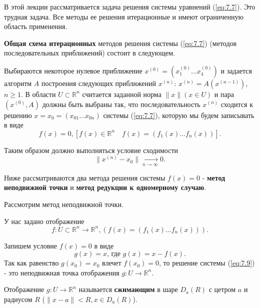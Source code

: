В этой лекции рассматривается задача решения системы уравнений (\ref{eq:7.7}). Это трудная задача. Все методы ее решения итерационные и имеют ограниченную область применения. 

\textbf{Общая схема итерационных} методов решения системы (\ref{eq:7.7}) (методов последовательных приближений) состоит в следующем.

Выбираются некоторое нулевое приближение $x^{(0)} = (x_1^{(0)} \dots x_4^{(0)})$ и задается алгоритм $A$ построения следующих приближений $x^{(n)}$: $x^{(n)} = A(x^{(n-1)})$, $n \geq 1$. В области $U \subset \mathbb{R}^n$ считается заданной норма $\|x\| (x \in U)$ и пара $(x^{(0)}, A)$ должны быть выбраны так, что последовательность $x^{(n)}$ сходится к решению $x = x_0 = (x_{01} \dots x_{0n})$ системы (\ref{eq:7.7}), которую мы будем записывать в виде
\begin{equation} \label{eq:7.9}
	f(x) = 0, [f(x) \in \mathbb{R}^n \quad f(x) = (f_1(x) \dots f_n(x))].
\end{equation}

Таким образом должно выполняться условие сходимости
\begin{equation} \label{eq:7.10}
	\|x^{(n)} - x_0\| \xrightarrow[n \to \infty]{} 0.
\end{equation}

Ниже рассматриваются два метода решения системы $f(x) = 0$ - \textbf{метод неподвижной точки} и \textbf{метод редукции к одномерному случаю}.

Рассмотрим метод неподвижной точки.

У нас задано отображение
\begin{equation} \label{eq:7.11}
	f: U \subset \mathbb{R}^n \to \mathbb{R}^n, (f(x) = (f_1(x) \dots f_n(x))).
\end{equation}

Запишем условие $f(x) = 0$ в виде
\begin{equation} \label{eq:7.12}
	g(x) = x \textrm{, где } g(x) = x - f(x).
\end{equation}
Так как равенство $g(x_0) = x_0$ влечет $f(x_0) = 0$, то решение системы (\ref{eq:7.9}) - это неподвижная точка отображения $g: U \to \mathbb{R}^n$.

Отображение $g: U \to \mathbb{R}^n$ называется \textbf{сжимающим} в шаре $D_a(R)$ с цетром $a$ и радиусом $R$ ($\|x - a\| < R, x \in D_a(R)$).

